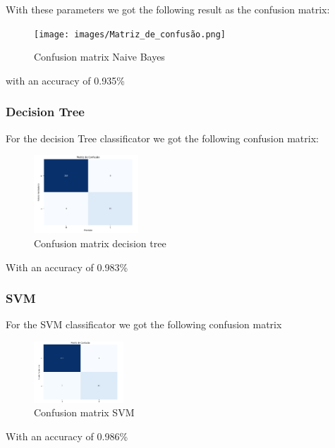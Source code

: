 \documentclass{sbrt}
\begin{document}
With these parameters we got the following result as the confusion matrix:

\begin{figure}[H]
    \centering
    \texttt{[image: images/Matriz\_de\_confusão.png]}
    \caption{Confusion matrix Naive Bayes}
    \label{fig:example}
\end{figure}\textbf{}

with an accuracy of 0.935\%

\subsubsection{Decision Tree}

For the decision Tree classificator we got the following confusion matrix:

\begin{figure}[H]
    \centering
    \includegraphics[width=0.35\textwidth]{images/confusion-matrix-decision-tree.png}
    \caption{Confusion matrix decision tree}
    \label{fig:example}
\end{figure}\textbf{}

With an accuracy of 0.983\%

\subsubsection{SVM}

For the SVM classificator we got the following confusion matrix

\begin{figure}[H]
    \centering
    \includegraphics[width=0.3\textwidth]{images/confusion-matrix-svm.png}
    \caption{Confusion matrix SVM}
    \label{fig:example}
\end{figure}\textbf{}

With an accuracy of 0.986\%
\end{document}
